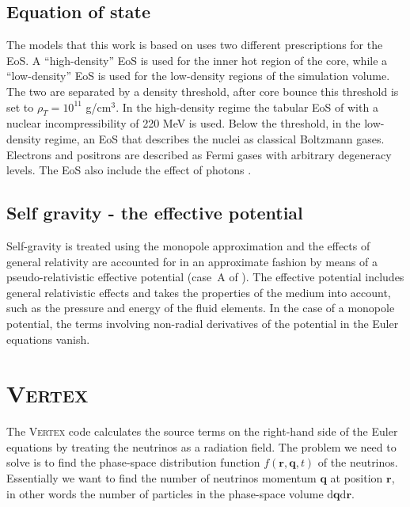 \subsection{Equation of state}
The models that this work is based on uses two different prescriptions
for the EoS. A ``high-density'' EoS is used for the inner
hot region of the core, while a ``low-density'' EoS is used for the low-density regions of the simulation volume. The two are separated by a density threshold,
after core bounce this threshold is set to $\rho_T = 10^{11}$ g/cm$^3$.
In the high-density regime the tabular EoS of 
\cite{lattimer_91} with a nuclear incompressibility of 220 MeV is used. 
Below the threshold, in the low-density regime, an EoS that describes the nuclei as
classical Boltzmann gases. Electrons and positrons are described as Fermi gases with arbitrary degeneracy levels. The EoS also include the effect of photons \citep{janka_99}.

\subsection{Self gravity - the effective potential}
Self-gravity is treated using the monopole                      
approximation and the effects of general relativity are accounted for                                               
in an approximate fashion by means of a pseudo-relativistic                                                          
effective potential (case~A of \cite{marek_06}). 
The effective potential includes general relativistic effects and
takes the properties of the medium into account, such as the pressure and energy
of the fluid elements. In the case of a monopole potential, the terms involving
non-radial derivatives of the potential in the Euler equations vanish.

\section{\textsc{Vertex}}
The \textsc{Vertex} code calculates the source terms on the right-hand side of the
Euler equations by treating the neutrinos as a radiation field. 
The problem we need to solve is to find the phase-space distribution function $f(\mathbf{r},\mathbf{q},t)$ of the neutrinos.
Essentially we want to find the number of neutrinos momentum $\mathbf{q}$ at position $\mathbf{r}$, in other
words the number of particles in the phase-space volume $\mathrm{d} \mathbf{q} \mathrm{d} \mathbf{r}$.

